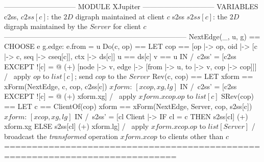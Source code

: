 \documentclass[preview, border={5pt 0pt 15pt 1pt}]{standalone}
\begin{document}
\begin{tla}
------------------------------ MODULE XJupiter ------------------------------
VARIABLES c2ss, \* $c2ss[c]$: the $2D$ digraph maintained at client $c$ 
          s2ss  \* $s2ss[c]$: the $2D$ digraph maintained by the $Server$ for client $c$
-----------------------------------------------------------------------------
NextEdge(_, u, g) == CHOOSE e \in g.edge: e.from = u
Do(c, op) == LET cop == [op |-> op, oid |-> [c |-> c, seq |-> cseq[c]], ctx |-> ds[c]]
                   u == ds[c]    v == u 
             IN  /\ c2ss' = [c2ss EXCEPT ![c] =
                    @ (+) [node |-> {v}, edge |-> {[from |-> u, to |-> v, cop |-> cop]}]]
                 /\ \* apply $op$ to $list[c]$; send $cop$ to the $Server$
Rev(c, cop) == LET xform == xForm(NextEdge, c, cop, c2ss[c]) \* $xform$: $[xcop, xg, lg]$
               IN  /\ c2ss' = [c2ss EXCEPT ![c] = @ (+) xform.xg]
                   /\ \* apply $xform.xcop.op$ to $list[c]$
SRev(cop) == 
    LET c == ClientOf(cop)
    xform == xForm(NextEdge, Server, cop, s2ss[c]) \* $xform$: $[xcop, xg, lg]$
    IN  /\ s2ss' = [cl \in Client |-> IF cl = c THEN s2ss[cl] (+) xform.xg
                                                ELSE s2ss[cl] (+) xform.lg]
        /\ \* apply $xform.xcop.op$ to $list[Server]$
        /\ \* broadcast the \emph{transformed} operation $xform.xcop$ to clients other than $c$
=============================================================================
\end{tla}
\end{document}
